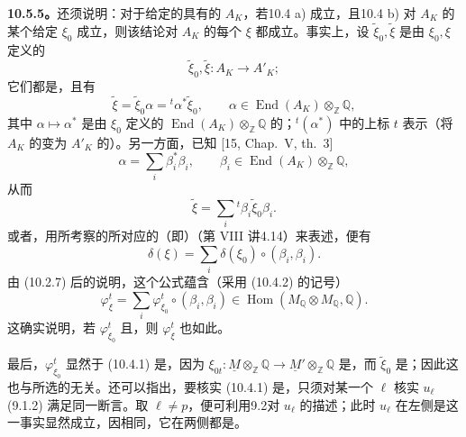 \textbf{10.5.5。}还须说明：对于给定的具有的 $A_K$，若10.4 a) 成立，且10.4 b) 对 $A_K$ 的某个给定 $\xi_0$ 成立，则该结论对 $A_K$ 的每个 $\xi$ 都成立。事实上，设 $\widetilde\xi_0,\widetilde\xi$ 是由 $\xi_0,\xi$ 定义的
\[
 \widetilde\xi_0,\widetilde\xi:A_K\longrightarrow A'_K;
\]
它们都是，且有
\[
 \widetilde\xi=\widetilde\xi_0\alpha={}^t\!\alpha^*\widetilde\xi_0,
 \qquad \alpha\in\operatorname{End}(A_K)\otimes_{\mathbb Z}\mathbb Q,
\]
其中 $\alpha\mapsto\alpha^*$ 是由 $\xi_0$ 定义的 $\operatorname{End}(A_K)\otimes_{\mathbb Z}\mathbb Q$ 的；${}^t(\alpha^*)$ 中的上标 $t$ 表示（将 $A_K$ 的变为 $A'_K$ 的）。另一方面，已知 [15, Chap.~V, th.~3]
\[
 \alpha=\sum_i\beta_i^*\beta_i,
 \qquad \beta_i\in\operatorname{End}(A_K)\otimes_{\mathbb Z}\mathbb Q,
\]
从而
\[
 \widetilde\xi=\sum_i{}^t\!\beta_i\widetilde\xi_0\beta_i.
\]
或者，用所考察的所对应的（即）（第 VIII 讲4.14）来表述，便有
\begin{equation}\tag{10.5.5.1}
 \delta(\xi)=\sum_i\delta(\xi_0)\circ(\beta_i,\beta_i).
\end{equation}
由 (10.2.7) 后的说明，这个公式蕴含（采用 (10.4.2) 的记号）
\begin{equation}\tag{10.5.5.2}
 \varphi^t_\xi=\sum_i\varphi^t_{\xi_0}\circ(\beta_i,\beta_i)
 \in\operatorname{Hom}(M_{\mathbb Q}\otimes M_{\mathbb Q},\mathbb Q).
\end{equation}
这确实说明，若 $\varphi^t_{\xi_0}$ 且，则 $\varphi^t_\xi$ 也如此。

最后，$\varphi^t_{\xi_0}$ 显然于 (10.4.1) 是，因为 $\xi_{0t}:\underline M\otimes_{\mathbb Z}\mathbb Q\longrightarrow\underline M'\otimes_{\mathbb Z}\mathbb Q$ 是，而 $\widetilde\xi_0$ 是；因此这也与所选的无关。还可以指出，要核实 (10.4.1) 是，只须对某一个 $\ell$ 核实 $u_\ell$ (9.1.2) 满足同一断言。取 $\ell\ne p$，便可利用9.2对 $u_\ell$ 的描述；此时 $u_\ell$ 在左侧是这一事实显然成立，因相同，它在两侧都是。

